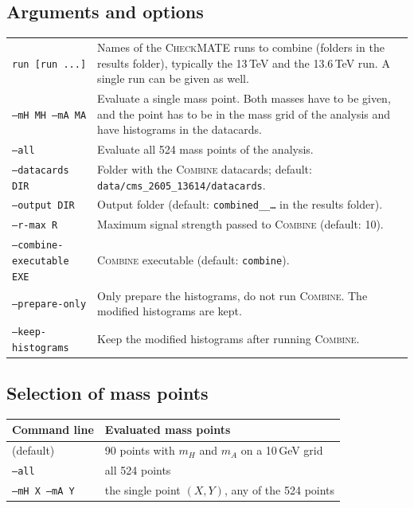 \documentclass[11pt,a4paper]{article}
\newcommand{\cm}{\textsc{CheckMATE}}
\newcommand{\combine}{\textsc{Combine}}
\newcommand{\file}[1]{\texttt{#1}}
\newcommand{\opt}[1]{\texttt{#1}}
\begin{document}
\subsection{Arguments and options}

\begin{center}
\begin{tabularx}{\textwidth}{lX}
\toprule
\opt{run [run ...]} & Names of the \cm{} runs to combine (folders in the
                      results folder), typically the 13\,TeV and the
                      13.6\,TeV run. A single run can be given as well. \\
\opt{--mH MH --mA MA} & Evaluate a single mass point. Both masses have to be
                      given, and the point has to be in the mass grid of
                      the analysis and have histograms in the datacards. \\
\opt{--all}         & Evaluate all 524 mass points of the analysis. \\
\opt{--datacards DIR} & Folder with the \combine{} datacards; default:\newline
                      \file{data/cms\_2605\_13614/datacards}. \\
\opt{--output DIR}  & Output folder (default:
                      \file{combined\_<run1>\_<run2>\ldots} in the results
                      folder). \\
\opt{--r-max R}     & Maximum signal strength passed to \combine{}
                      (default: 10). \\
\opt{--combine-executable EXE} & \combine{} executable (default:
                      \texttt{combine}). \\
\opt{--prepare-only} & Only prepare the histograms, do not run \combine{}.
                      The modified histograms are kept. \\
\opt{--keep-histograms} & Keep the modified histograms after running
                      \combine{}. \\
\bottomrule
\end{tabularx}
\end{center}

\subsection{Selection of mass points}

\begin{center}
\begin{tabular}{ll}
\toprule
Command line & Evaluated mass points \\
\midrule
(default)              & 90 points with $m_H$ and $m_A$ on a 10\,GeV grid \\
\opt{--all}            & all 524 points \\
\opt{--mH X --mA Y}    & the single point $(X, Y)$, any of the 524 points \\
\bottomrule
\end{tabular}
\end{center}
\end{document}
